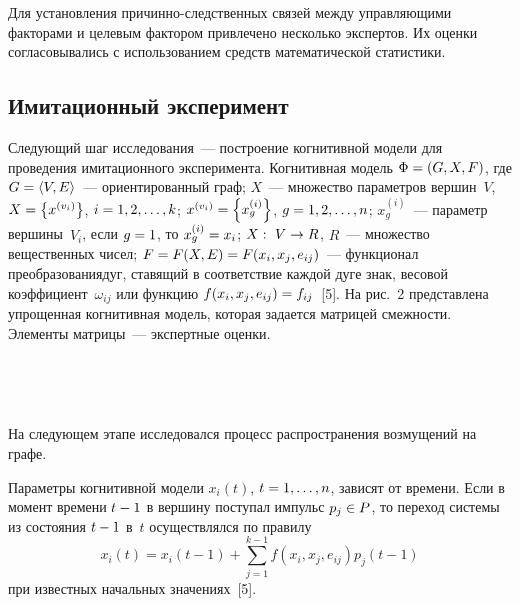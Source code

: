\begin{multicols}{2}
     
     Для установления при\-чин\-но-след\-ст\-вен\-ных связей между 
управляющими факторами и целевым фактором привлечено несколько 
экспертов. Их оценки согласовывались с использованием средств 
математической статистики. 
     
     \subsection{Имитационный эксперимент}
     
     Следующий шаг исследования~--- построение когнитивной модели для 
проведения имитационного эксперимента. Когнитивная модель $\Phi\hm= 
(G,X,F)$, где $G\hm=\langle V, E\rangle$~--- ориентированный граф; $X$~--- 
множество параметров вершин~$V$, $X\hm=\left\{x^{(v_i)}\right\}$, $i \hm= 
1, 2, \ldots , k$; $x^{(v_i)} \hm=\left\{ x^{(i)}_g\right\}$, $g\hm = 1, 2, \ldots , n$; 
$x^{(i)}_g$~--- параметр вершины~$V_i$, \mbox{если} $g\hm = 1$, то $x^{(i)}_g\hm = 
x_i$; $X:\ V\hm\to R$, $R$~--- множество вещественных чисел; $F\hm=F(X, 
E)\hm=F(x_i, x_j, e_{ij})$~--- функционал преобразования\linebreak дуг, ставящий в 
соответ\-ствие каждой дуге знак, весовой коэффициент~$\omega_{ij}$ или 
функцию $f(x_i, x_j, e_{ij}) \hm= f_{ij}$~[5]. На рис.~2 представлена упрощенная 
когнитивная модель, которая задается матрицей смежности. Элементы 
матрицы~--- экспертные оценки.
     
\begin{figure*} %
\vspace*{1pt}
 \begin{center}
 \mbox{%
 \epsfxsize=150mm
 }
 \end{center}
 \vspace*{-9pt}
\end{figure*}
\begin{figure*}[b] %
\vspace*{3pt}
 \begin{center}
 \mbox{%
 \epsfxsize=163.112mm
 }
 \end{center}
 \vspace*{-9pt}
\end{figure*}

     На следующем этапе исследовался процесс распространения 
возмущений на графе. 
     
     Параметры когнитивной модели $x_i(t)$, $t\hm= 1, \ldots , n$, зависят от 
времени. Если в момент времени $t\hm- 1$ в вершину поступал импульс $p_j
     \hm\in P$, то переход системы из состояния $t\hm-1$ в~$t$ 
осуществлялся по правилу 
     $$
     x_i(t) =x_i(t-1) +\sum\limits_{j=1}^{k-1} f(x_i, x_j, e_{ij}) p_j(t-1)
     $$
     при известных начальных значениях~[5].
     

\end{multicols}
